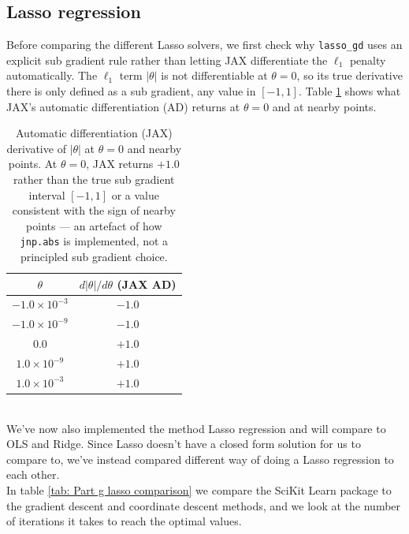 \documentclass[reprint,english,notitlepage]{revtex4-2}  %
\begin{document}
\subsection{Lasso regression} %
Before comparing the different Lasso solvers, we first check why \texttt{lasso\_gd} uses an explicit sub gradient rule rather than letting JAX differentiate the $\ell_1$ penalty automatically. The $\ell_1$ term $|\theta|$ is not differentiable at $\theta = 0$, so its true derivative there is only defined as a sub gradient, any value in $[-1, 1]$. Table \ref{tab: Part g AD subgradient} shows what JAX's automatic differentiation (AD) returns at $\theta = 0$ and at nearby points. 
\begin{table}[h]
    \centering
    \begin{tabular}{c c}
        \toprule
        $\theta$ & $d|\theta|/d\theta$ (JAX AD) \\
        \midrule
        $-1.0 \times 10^{-3}$ & $-1.0$ \\
        $-1.0 \times 10^{-9}$ & $-1.0$ \\
        $0.0$                 & $+1.0$ \\
        $1.0 \times 10^{-9}$  & $+1.0$ \\
        $1.0 \times 10^{-3}$  & $+1.0$ \\
        \bottomrule
    \end{tabular}
    \caption{Automatic differentiation (JAX) derivative of $|\theta|$ at $\theta = 0$ and nearby points. At $\theta = 0$, JAX returns $+1.0$ rather than the true sub gradient interval $[-1, 1]$ or a value consistent with the sign of nearby points — an artefact of how \texttt{jnp.abs} is implemented, not a principled sub gradient choice.}
    \label{tab: Part g AD subgradient}
\end{table}\\
We've now also implemented the method Lasso regression and will compare to OLS and Ridge. Since Lasso doesn't have a closed form solution for us to compare to, we've instead compared different way of doing a Lasso regression to each other. \\
In table \ref{tab: Part g lasso comparison} we compare the SciKit Learn package \cite{SKlearn_lasso} to the gradient descent and coordinate descent methods, and we look at the number of iterations it takes to reach the optimal values. \\ 
\end{document}
